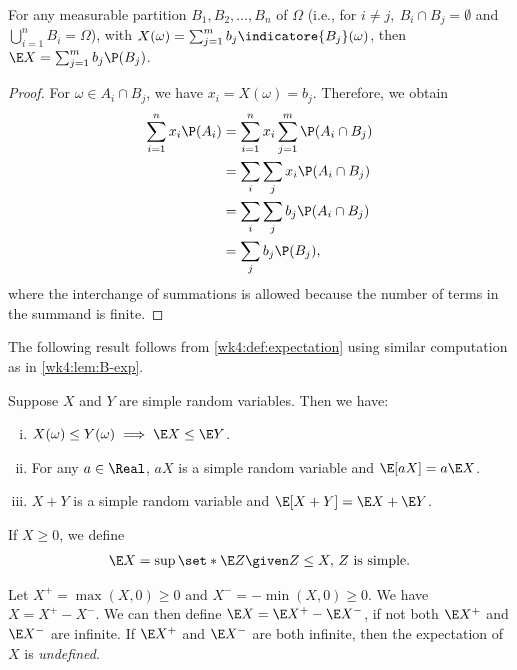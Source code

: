 \documentclass[../aipt.tex]{subfiles}
\begin{document}
\begin{Lemma}\label{wk4:lem:B-exp}
For any measurable partition $B_1,B_2,\ldots,B_n$ of $\Omega$ (i.e., for $i \neq j,\ B_{i}\cap B_{j}= \emptyset$ and $\bigcup_{i=1}^n{B_{i}} = \Omega$), with $X(\omega)=\sum_{j=1}^m b_j \indicatore{B_j}(\omega)$, then $\E X= \sum_{j=1}^m{b_j \P({B_j})}$.
\end{Lemma}
\begin{proof}
For $\omega \in A_i\cap B_j$, we have $x_i=X(\omega)= b_j$. Therefore, we obtain
\begin{align*}
\sum_{i=1}^n{x_i \P(A_i)}
& = \sum_{i=1}^n{x_i}\sum_{j=1}^m{\P(A_i\cap B_j)}\\
& = \sum_{i} \sum_{j} {x_i\P(A_i\cap B_j)}\\
& = \sum_{i} \sum_{j} {b_j\P(A_i\cap B_j)}\\
& =\sum_{j} {b_j\P(B_j)}, 
\end{align*}
where the interchange of summations is allowed because the number of terms in the summand is finite.
\end{proof}


The following result follows from \cref{wk4:def:expectation} using similar computation as in \cref{wk4:lem:B-exp}.
\begin{Lemma}\label{wk4:lem:simpleprop}
Suppose $X$ and $Y$ are simple random variables. Then we have:
\begin{enumerate}[(i)]
\item $X(\omega)\leq Y(\omega) \implies \E X \leq \E Y$.
\item For any $a\in\Real$, $aX$ is a simple random variable and $\E[a X]= a \E X$.
\item $X+Y$ is a simple random variable and $\E[X + Y]=\E X + \E Y$.
\end{enumerate}
\end{Lemma}

\begin{Definition}\label{wk4:def:expectation_nz}
If $X \geq 0$, we define
\begin{align*}
\E X = \sup\set*{\E Z \given Z\leq X,\, Z \text{ is simple}}.
\end{align*}
\end{Definition}

Let $X^+=\max(X,0)\geq 0$ and $X^-=-\min(X,0)\geq 0$. We have $X=X^+ - X^-$. We can then define $\E X= \E X^+- \E X^-$, if not both $\E X^+$ and $\E X^-$ are infinite. If $\E X^+$ and $\E X^-$ are both infinite, then the expectation of $X$ is \emph{undefined}.
\end{document}
